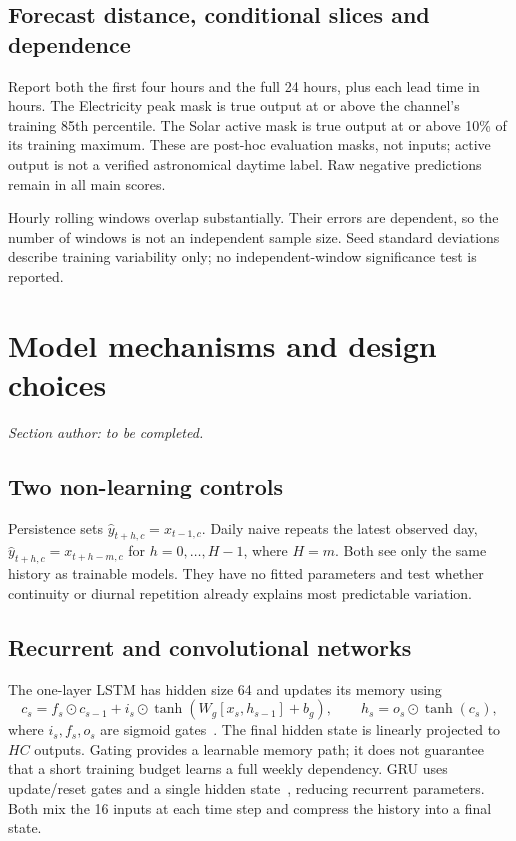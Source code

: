 \documentclass[10pt,a4paper]{article}
\begin{document}
\subsection{Forecast distance, conditional slices and dependence}
Report both the first four hours and the full 24 hours, plus each lead time in hours. The Electricity peak mask is true output at or above the channel's training 85th percentile. The Solar active mask is true output at or above 10\% of its training maximum. These are post-hoc evaluation masks, not inputs; active output is not a verified astronomical daytime label. Raw negative predictions remain in all main scores.

Hourly rolling windows overlap substantially. Their errors are dependent, so the number of windows is not an independent sample size. Seed standard deviations describe training variability only; no independent-window significance test is reported.

\clearpage
\section{Model mechanisms and design choices}
\noindent\textit{Section author: to be completed.}


\subsection{Two non-learning controls}
Persistence sets $\hat y_{t+h,c}=x_{t-1,c}$. Daily naive repeats the latest observed day, $\hat y_{t+h,c}=x_{t+h-m,c}$ for $h=0,\ldots,H-1$, where $H=m$. Both see only the same history as trainable models. They have no fitted parameters and test whether continuity or diurnal repetition already explains most predictable variation.
\subsection{Recurrent and convolutional networks}
The one-layer LSTM has hidden size 64 and updates its memory using
\[
c_s=f_s\odot c_{s-1}+i_s\odot\tanh(W_g[x_s,h_{s-1}]+b_g),\qquad h_s=o_s\odot\tanh(c_s),
\]
where $i_s,f_s,o_s$ are sigmoid gates~\cite{lstm}. The final hidden state is linearly projected to $HC$ outputs. Gating provides a learnable memory path; it does not guarantee that a short training budget learns a full weekly dependency. GRU uses update/reset gates and a single hidden state~\cite{gru}, reducing recurrent parameters. Both mix the 16 inputs at each time step and compress the history into a final state.
\end{document}
